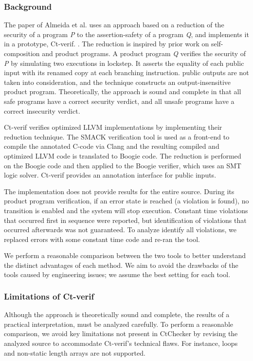 \subsubsection{Background}
The paper of Almeida et al. uses an approach based on a reduction of the
security of a program \textit{P} to the assertion-safety of a program
\textit{Q}, and implements it in a prototype, Ct-verif.
\cite{almeida2016verifying}. The reduction is inspired by prior work
on self-composition and product programs.  A product program \textit{Q}
verifies the security of \textit{P} by simulating two executions in lockstep.
It asserts the equality of each public input with its renamed copy at each
branching instruction.  public outputs are not taken into consideration, and
the technique constructs an output-insensitive product program.  Theoretically,
the approach is sound and complete in that all safe programs have a correct
security verdict, and all unsafe programs have a correct insecurity verdict.

Ct-verif verifies optimized LLVM implementations by implementing their reduction
technique.  The SMACK verification tool is used as a front-end to compile the
annotated C-code via Clang and the resulting compiled and optimized LLVM code
is translated to Boogie code.  The reduction is performed on the Boogie code and
then applied to the Boogie verifier, which uses an SMT logic solver.  Ct-verif
provides an annotation interface for public inputs.

The implementation does not provide results for the entire source. During its
product program verification, if an error state is reached (a violation is
found), no transition is enabled and the system will stop execution. Constant
time violations that occurred first in sequence were reported, but
identification of violations that occurred afterwards was not guaranteed.
To analyze identify all violations, we replaced errors with some constant time
code and re-ran the tool.

We perform a reasonable comparison between the two tools to better understand
the distinct advantages of each method. We aim to avoid the drawbacks of the tools
caused by engineering issues; we assume the best setting for each tool.

\subsubsection{Limitations of Ct-verif}
Although the approach is theoretically sound and complete, the results of
a practical interpretation, must be analyzed carefully.  To perform
a reasonable comparison, we avoid key limitations not present in CtChecker by
revising the analyzed source to accommodate Ct-verif's technical flaws.  For
instance, loops and non-static length arrays are not supported.

